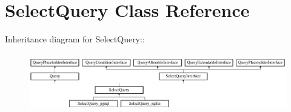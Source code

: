 \hypertarget{classSelectQuery}{
\section{SelectQuery Class Reference}
\label{classSelectQuery}
}
Inheritance diagram for SelectQuery::\begin{figure}[H]
\begin{center}
\leavevmode
\includegraphics[height=2.57471cm]{classSelectQuery}
\end{center}
\end{figure}
